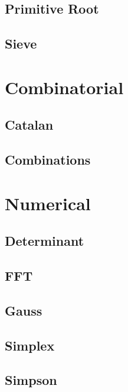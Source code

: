 \subsection{Primitive Root}
\raggedbottom
\hrulefill
\subsection{Sieve}
\raggedbottom
\hrulefill
\newpage

\section{Combinatorial}
\subsection{Catalan}
\raggedbottom
\hrulefill
\subsection{Combinations}
\raggedbottom
\hrulefill
\newpage

\section{Numerical}
\subsection{Determinant}
\raggedbottom
\hrulefill
\subsection{FFT}
\raggedbottom
\hrulefill
\subsection{Gauss}
\raggedbottom
\hrulefill
\subsection{Simplex}
\raggedbottom
\hrulefill
\subsection{Simpson}
\raggedbottom
\hrulefill
